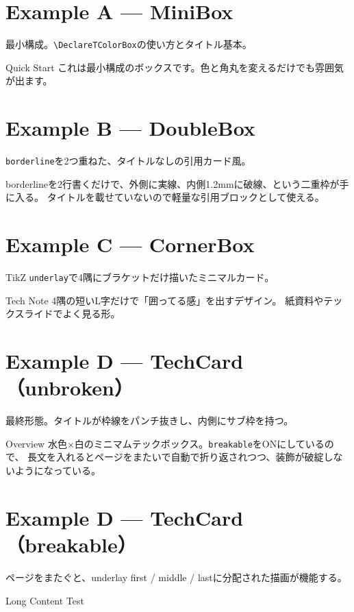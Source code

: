 \documentclass[a4paper,11pt]{ltjsarticle}
\begin{document}
\section*{Example A — MiniBox}
最小構成。\verb|\DeclareTColorBox|の使い方とタイトル基本。

\begin{MiniBox}{Quick Start}
これは最小構成のボックスです。色と角丸を変えるだけでも雰囲気が出ます。
\end{MiniBox}

\section*{Example B — DoubleBox}
\verb|borderline|を2つ重ねた、タイトルなしの引用カード風。

\begin{DoubleBox}
borderlineを2行書くだけで、外側に実線、内側1.2mmに破線、という二重枠が手に入る。
タイトルを載せていないので軽量な引用ブロックとして使える。
\end{DoubleBox}

\section*{Example C — CornerBox}
TikZ \verb|underlay|で4隅にブラケットだけ描いたミニマルカード。

\begin{CornerBox}{Tech Note}
4隅の短いL字だけで「囲ってる感」を出すデザイン。
紙資料やテックスライドでよく見る形。
\end{CornerBox}

\section*{Example D — TechCard（unbroken）}
最終形態。タイトルが枠線をパンチ抜きし、内側にサブ枠を持つ。

\begin{TechCard}{Overview}
水色×白のミニマムテックボックス。\verb|breakable|をONにしているので、
長文を入れるとページをまたいで自動で折り返されつつ、装飾が破綻しないようになっている。
\end{TechCard}

\section*{Example D — TechCard（breakable）}
ページをまたぐと、underlay first / middle / lastに分配された描画が機能する。

\begin{TechCard}{Long Content Test}
\lipsum[1-7]
\end{TechCard}
\end{document}
